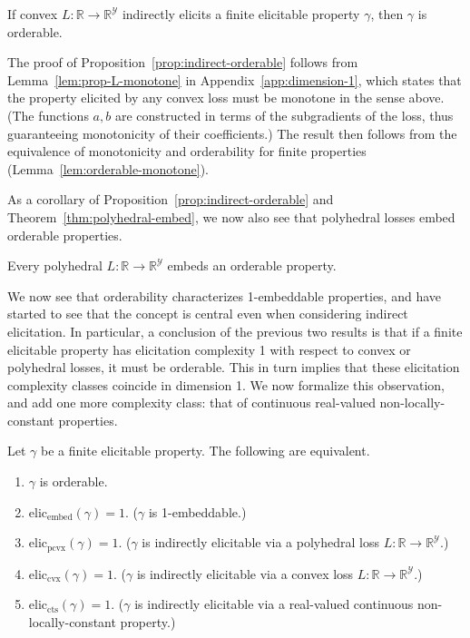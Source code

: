 \documentclass[anon,12pt]{colt2019}
\newcommand{\reals}{\mathbb{R}}
\newcommand{\eliccts}{\mathrm{elic}_\mathrm{cts}}
\newcommand{\eliccvx}{\mathrm{elic}_\mathrm{cvx}}
\newcommand{\elicpoly}{\mathrm{elic}_\mathrm{pcvx}}
\newcommand{\elicembed}{\mathrm{elic}_\mathrm{embed}}
\newcommand{\Y}{\mathcal{Y}}
\begin{document}
\begin{proposition}\label{prop:indirect-orderable}
  If convex $L : \reals \to \reals^\Y$ indirectly elicits a finite elicitable property $\gamma$, then $\gamma$ is orderable.
\end{proposition}

The proof of Proposition~\ref{prop:indirect-orderable} follows from Lemma~\ref{lem:prop-L-monotone} in Appendix~\ref{app:dimension-1}, which states that the property elicited by any convex loss must be monotone in the sense above.
(The functions $a,b$ are constructed in terms of the subgradients of the loss, thus guaranteeing monotonicity of their coefficients.)
The result then follows from the equivalence of monotonicity and orderability for finite properties (Lemma~\ref{lem:orderable-monotone}).

As a corollary of Proposition~\ref{prop:indirect-orderable} and Theorem~\ref{thm:polyhedral-embed}, we now also see that polyhedral losses embed orderable properties.

\begin{corollary}\label{cor:embed-orderable}
  Every polyhedral $L : \reals \to \reals^\Y$ embeds an orderable property.
\end{corollary}

We now see that orderability characterizes 1-embeddable properties, and have started to see that the concept is central even when considering indirect elicitation.
In particular, a conclusion of the previous two results is that if a finite elicitable property has elicitation complexity 1 with respect to convex or polyhedral losses, it must be orderable.
This in turn implies that these elicitation complexity classes coincide in dimension 1.
We now formalize this observation, and add one more complexity class: that of continuous real-valued non-locally-constant properties.

\begin{theorem}\label{thm:1d-tfae}
  Let $\gamma$ be a finite elicitable property.
  The following are equivalent.
  \begin{enumerate}
  \item $\gamma$ is orderable.
  \item $\elicembed(\gamma)=1$. ($\gamma$ is 1-embeddable.)
  \item $\elicpoly(\gamma)=1$. ($\gamma$ is indirectly elicitable via a polyhedral loss $L:\reals\to\reals^\Y$.)
  \item $\eliccvx(\gamma)=1$. ($\gamma$ is indirectly elicitable via a convex loss $L:\reals\to\reals^\Y$.)
  \item $\eliccts(\gamma)=1$. ($\gamma$ is indirectly elicitable via a real-valued continuous non-locally-constant property.)
  \end{enumerate}
\end{theorem}
\end{document}
